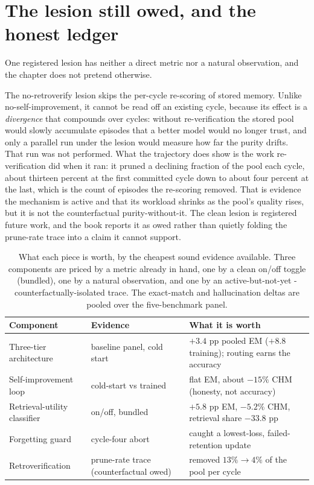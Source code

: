 \section{The lesion still owed, and the honest ledger}
\label{sec:abl-owed}

One registered lesion has neither a direct metric nor a natural observation, and the
chapter does not pretend otherwise.

\begin{pitfall}
The no-retroverify lesion skips the per-cycle re-scoring of stored memory. Unlike
no-self-improvement, it cannot be read off an existing cycle, because its effect is a
\emph{divergence} that compounds over cycles: without re-verification the stored pool
would slowly accumulate episodes that a better model would no longer trust, and only a
parallel run under the lesion would measure how far the purity drifts. That run was not
performed. What the trajectory does show is the work re-verification did when it ran: it
pruned a declining fraction of the pool each cycle, about thirteen percent at the first
committed cycle down to about four percent at the last, which is the count of episodes
the re-scoring removed. That is evidence the mechanism is active and that its workload
shrinks as the pool's quality rises, but it is not the counterfactual purity-without-it.
The clean lesion is registered future work, and the book reports it as owed rather than
quietly folding the prune-rate trace into a claim it cannot support.
\end{pitfall}

\begin{table}[htbp]
\centering
\small
\begin{tabular}{@{}p{3.0cm}p{3.6cm}p{7.2cm}@{}}
\toprule
\textbf{Component} & \textbf{Evidence} & \textbf{What it is worth} \\
\midrule
Three-tier architecture     & baseline panel, cold start            & $+3.4$ pp pooled EM ($+8.8$ training); routing earns the accuracy \\
Self-improvement loop       & cold-start vs trained                 & flat EM, about $-15\%$ CHM (honesty, not accuracy) \\
Retrieval-utility classifier& on/off, bundled                       & $+5.8$ pp EM, $-5.2\%$ CHM, retrieval share $-33.8$ pp \\
Forgetting guard            & cycle-four abort                      & caught a lowest-loss, failed-retention update \\
Retroverification           & prune-rate trace (counterfactual owed)& removed $13\%\!\to\!4\%$ of the pool per cycle \\
\bottomrule
\end{tabular}
\caption[The component ledger]{What each piece is worth, by the cheapest sound evidence
available. Three components are priced by a metric already in hand, one by a clean
on/off toggle (bundled), one by a natural observation, and one by an active-but-not-yet
-counterfactually-isolated trace. The exact-match and hallucination deltas are pooled
over the five-benchmark panel.}
\label{tab:abl-ledger}
\end{table}

